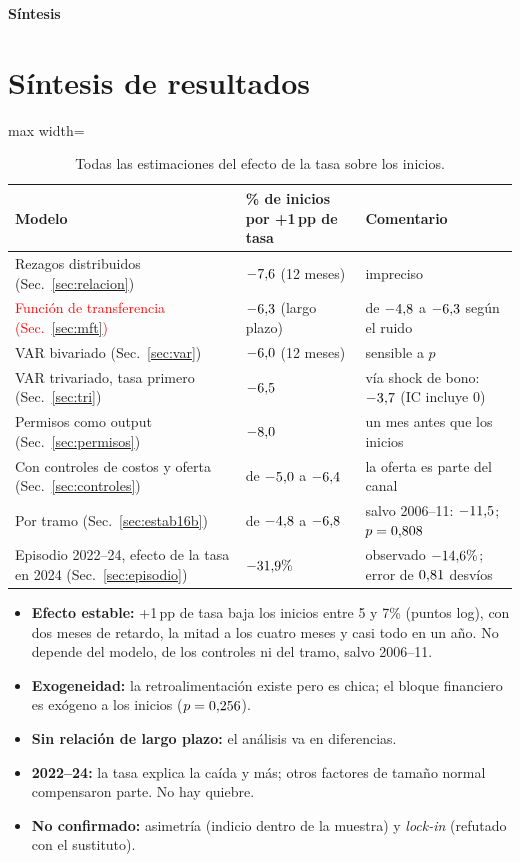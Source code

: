 \documentclass[11pt,a4paper]{article}
\newcommand{\parte}[1]{\bigskip\begin{center}\large\bfseries #1\end{center}}
\begin{document}
\newpage
\parte{S\'intesis}

\section{S\'intesis de resultados}\label{sec:sintesis}
\begin{table}[H]\centering\small
\begin{adjustbox}{max width=\linewidth}\begin{tabular}{lll}
\toprule
Modelo & \% de inicios por +1\,pp de tasa & Comentario \\
\midrule
Rezagos distribuidos (Sec.~\ref{sec:relacion}) & $-7{,}6$ (12 meses) & impreciso \\
\textcolor{red}{Funci\'on de transferencia (Sec.~\ref{sec:mft})} & \textcolor{red}{$-6{,}3$} (largo plazo) & de $-4{,}8$ a $-6{,}3$ seg\'un el ruido \\
VAR bivariado (Sec.~\ref{sec:var}) & $-6{,}0$ (12 meses) & sensible a $p$ \\
VAR trivariado, tasa primero (Sec.~\ref{sec:tri}) & $-6{,}5$ & v\'ia shock de bono: $-3{,}7$ (IC incluye 0) \\
Permisos como output (Sec.~\ref{sec:permisos}) & $-8{,}0$ & un mes antes que los inicios \\
Con controles de costos y oferta (Sec.~\ref{sec:controles}) & de $-5{,}0$ a $-6{,}4$ & la oferta es parte del canal \\
Por tramo (Sec.~\ref{sec:estab16b}) & de $-4{,}8$ a $-6{,}8$ & salvo 2006--11: $-11{,}5$; $p=0{,}808$ \\
\midrule
Episodio 2022--24, efecto de la tasa en 2024 (Sec.~\ref{sec:episodio}) & $-31{,}9\%$ & observado $-14{,}6\%$; error de $0{,}81$ desv\'ios \\
\bottomrule
\end{tabular}\end{adjustbox}
\caption{Todas las estimaciones del efecto de la tasa sobre los inicios.}\label{tab:sintesis}
\end{table}
\begin{itemize}
\item \textbf{Efecto estable:} +1\,pp de tasa baja los inicios entre 5 y 7\% (puntos log), con dos meses de retardo, la mitad a los cuatro meses y casi todo en un a\~no. No depende del modelo, de los controles ni del tramo, salvo 2006--11.
\item \textbf{Exogeneidad:} la retroalimentaci\'on existe pero es chica; el bloque financiero es ex\'ogeno a los inicios ($p=0{,}256$).
\item \textbf{Sin relaci\'on de largo plazo:} el an\'alisis va en diferencias.
\item \textbf{2022--24:} la tasa explica la ca\'ida y m\'as; otros factores de tama\~no normal compensaron parte. No hay quiebre.
\item \textbf{No confirmado:} asimetr\'ia (indicio dentro de la muestra) y \emph{lock-in} (refutado con el sustituto).
\end{itemize}
\end{document}
